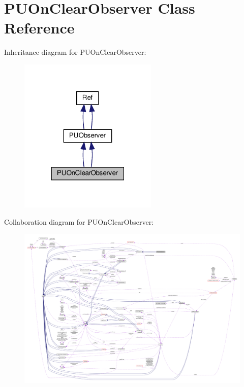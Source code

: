 \hypertarget{classPUOnClearObserver}{}\section{P\+U\+On\+Clear\+Observer Class Reference}
\label{classPUOnClearObserver}


Inheritance diagram for P\+U\+On\+Clear\+Observer\+:
\nopagebreak
\begin{figure}[H]
\begin{center}
\leavevmode
\includegraphics[width=187pt]{classPUOnClearObserver__inherit__graph}
\end{center}
\end{figure}


Collaboration diagram for P\+U\+On\+Clear\+Observer\+:
\nopagebreak
\begin{figure}[H]
\begin{center}
\leavevmode
\includegraphics[width=350pt]{classPUOnClearObserver__coll__graph}
\end{center}
\end{figure}
